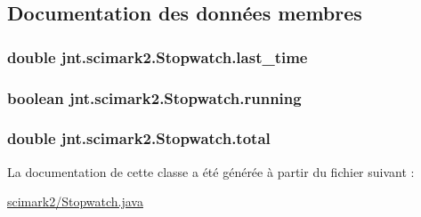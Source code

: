 \subsection{Documentation des données membres}
\hypertarget{classjnt_1_1scimark2_1_1Stopwatch_a73fc2c69e2ed31f72dd55ef03ef58576}{
\subsubsection[{last\-\_\-time}]{\setlength{\rightskip}{0pt plus 5cm}double jnt.\-scimark2.\-Stopwatch.\-last\-\_\-time\hspace{0.3cm}{\ttfamily [private]}}}\label{classjnt_1_1scimark2_1_1Stopwatch_a73fc2c69e2ed31f72dd55ef03ef58576}
\hypertarget{classjnt_1_1scimark2_1_1Stopwatch_a8c263f03c85291abc4d4e9c32a0083b3}{
\subsubsection[{running}]{\setlength{\rightskip}{0pt plus 5cm}boolean jnt.\-scimark2.\-Stopwatch.\-running\hspace{0.3cm}{\ttfamily [private]}}}\label{classjnt_1_1scimark2_1_1Stopwatch_a8c263f03c85291abc4d4e9c32a0083b3}
\hypertarget{classjnt_1_1scimark2_1_1Stopwatch_ae3a413a0f9c0fab717d98fa5af2bcabb}{
\subsubsection[{total}]{\setlength{\rightskip}{0pt plus 5cm}double jnt.\-scimark2.\-Stopwatch.\-total\hspace{0.3cm}{\ttfamily [private]}}}\label{classjnt_1_1scimark2_1_1Stopwatch_ae3a413a0f9c0fab717d98fa5af2bcabb}


La documentation de cette classe a été générée à partir du fichier suivant \-:\begin{DoxyCompactItemize}
\item 
\hyperlink{scimark2_2Stopwatch_8java}{scimark2/\-Stopwatch.\-java}\end{DoxyCompactItemize}
